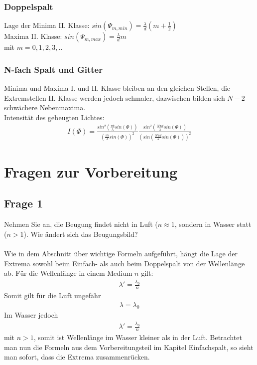 \documentclass[a4paper,10pt]{scrartcl}
\begin{document}
		\subsubsection{Doppelspalt}
			Lage der Minima II. Klasse: \(sin(\Psi_{m,min})=\frac{\lambda}{d}(m+\frac{1}{2})\)\\
			Maxima II. Klasse: \(sin(\Psi_{m,max})=\frac{\lambda}{d}m\)\\
			mit \(m=0,1,2,3,..\)
			
		\subsubsection{N-fach Spalt und Gitter}
			Minima und Maxima I. und II. Klasse bleiben an den gleichen Stellen, die Extremstellen II. Klasse werden jedoch schmaler, dazwischen bilden sich \(N-2\) schwächere Nebenmaxima.\\
			Intensität des gebeugten Lichtes: 
			\begin{align*}
			I(\Phi)=\frac{sin^{2}(\frac{\pi b}{\lambda}sin(\Phi))}{(\frac{\pi b}{\lambda}sin(\Phi))^{2}}\frac{sin^{2}(\frac{N\pi d}{\lambda}sin(\Phi))}{(sin(\frac{N\pi d}{\lambda}sin(\Phi)))^{2}}
			\end{align*}
		
		


	\section{Fragen zur Vorbereitung}
		\subsection{Frage 1}
		Nehmen Sie an, die Beugung findet nicht in Luft (\(n\approx1\), sondern in Wasser statt (\(n>1\)). Wie
		ändert sich das Beugungsbild?\\
		\\
		Wie in dem Abschnitt über wichtige Formeln aufgeführt, hängt die Lage der Extrema sowohl beim Einfach- als auch beim Doppelspalt von der Wellenlänge ab. Für die Wellenlänge in einem Medium \(n\) gilt: 
		\begin{align*}
		\lambda '= \frac{\lambda_{0}}{n}
		\end{align*}
		Somit gilt für die Luft ungefähr
		\begin{align*}
		\lambda = \lambda_{0}
		\end{align*}
		Im Wasser jedoch
		\begin{align*}
		\lambda '= \frac{\lambda_{0}}{n}
		\end{align*}
		mit \(n>1\), somit ist Wellenlänge im Wasser kleiner als in der Luft. Betrachtet man nun die Formeln aus dem Vorbereitungsteil im Kapitel Einfachspalt, so sieht man sofort, dass die Extrema zusammenrücken.
		
\end{document}

